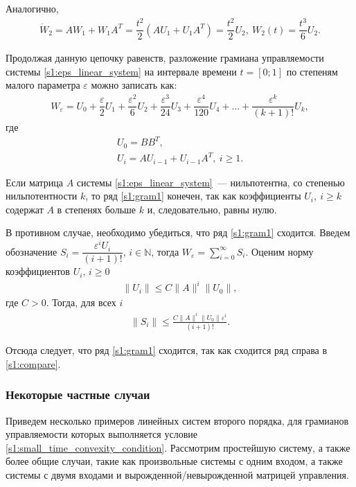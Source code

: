 \documentclass[../main.tex]{subfiles}
\begin{document}
Аналогично,
\begin{gather*}
    \dot{W}_2 = A W_1 + W_1 A^T = \dfrac{t^2}{2} \left( A U_1 + U_1 A^T \right) = \dfrac{t^2}{2} U_2 ,  \ W_2(t) = \dfrac{t^3}{6}U_2.
\end{gather*}
 
Продолжая данную цепочку равенств, разложение грамиана управляемости системы \eqref{s1:eps_linear_system} на интервале времени $t = [0;1] $ по степеням малого параметра $ \varepsilon $ можно записать как:
\begin{gather}\label{s1:gram1}
    W_{\varepsilon} = U_0 + \dfrac{\varepsilon}{2}U_1 + \dfrac{\varepsilon^2}{6} U_2 + \dfrac{\varepsilon^3}{24}U_3 + \dfrac{\varepsilon^4}{120}U_4 + \dots + \dfrac{\varepsilon^k}{(k+1)!}U_k,
\end{gather}
где
\begin{gather*}
    U_0 = B B^T, \\
    U_i  = A U_{i-1} + U_{i-1} A^T, \ i \geqslant 1.
\end{gather*}
 
Если матрица $ A $ системы \eqref{s1:eps_linear_system}~--- нильпотентна, со степенью нильпотентности $ k $, то ряд \eqref{s1:gram1} конечен, так как коэффициенты $ U_i, \ i \geqslant k$ содержат $ A $ в степенях больше $ k$ и, следовательно, равны нулю.

В противном случае, необходимо убедиться, что ряд  \eqref{s1:gram1}  сходится. 
Введем обозначение $ S_i = \dfrac{\varepsilon^i U_i}{(i + 1)!} $, $i \in \mathbb{N}$, тогда $W_{\varepsilon} = \sum\limits_{i = 0}^{\infty} S_i$.
Оценим норму коэффициентов $ U_i $, $ i \geqslant 0$
\begin{gather*}
	\| U_i \| \leqslant C \|A\|^i \|U_0\|, 
\end{gather*}
где $C > 0$. 
Тогда, для всех $i$
\begin{gather}\label{s1:compare}
		\|S_i\| \leqslant \frac{C \|A\|^i \|U_0\| \varepsilon^i}{(i + 1)!}.
\end{gather} 
 
 Отсюда следует, что ряд \eqref{s1:gram1} сходится, так как сходится ряд справа в \eqref{s1:compare}.
 
\subsubsection{Некоторые частные случаи}
\label{s1:examples}
Приведем  несколько примеров линейных систем второго порядка, для грамианов управляемости которых выполняется условие \eqref{s1:small_time_convexity_condition}.
Рассмотрим простейшую систему, а также более общие случаи, такие как произвольные системы с одним входом, а также системы с двумя входами и вырожденной/невырожденной матрицей управления.
\end{document}
